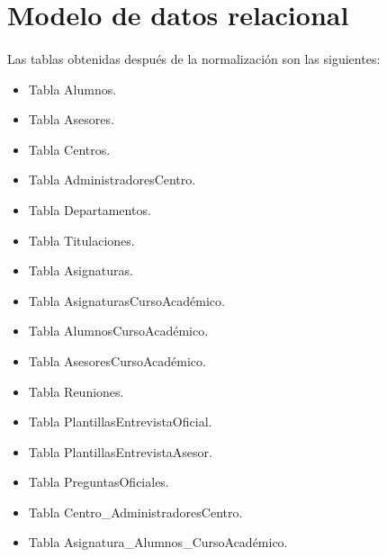\section{Modelo de datos relacional}

  \paragraph{}Las tablas obtenidas después de la normalización son las
  siguientes:

  \begin{itemize}
   \item Tabla Alumnos.
   \item Tabla Asesores.
   \item Tabla Centros.
   \item Tabla AdministradoresCentro.
   \item Tabla Departamentos.
   \item Tabla Titulaciones.
   \item Tabla Asignaturas.
   \item Tabla AsignaturasCursoAcadémico.
   \item Tabla AlumnosCursoAcadémico.
   \item Tabla AsesoresCursoAcadémico.
   \item Tabla Reuniones.
   \item Tabla PlantillasEntrevistaOficial.
   \item Tabla PlantillasEntrevistaAsesor.
   \item Tabla PreguntasOficiales.
   \item Tabla Centro\_AdministradoresCentro.
   \item Tabla Asignatura\_Alumnos\_CursoAcadémico.
  \end{itemize}

















